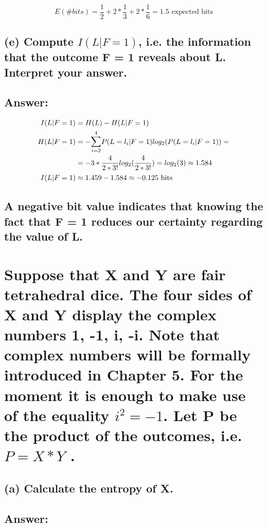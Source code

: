\documentclass[11px]{article}
\begin{document}
\begin{equation}
E(\#bits) = \frac{1}{2} + 2*\frac{1}{3} + 2*\frac{1}{6} = 1.5 \text{ expected bits}
\end{equation}

\subsection*{\normalfont (e) Compute \(I(L|F = 1)\), i.e. the information that the outcome F = 1 reveals about L. Interpret your answer.}

\subsection*{Answer:}

\begin{equation}
\begin{split}
I(L|F = 1) & = H(L) - H(L|F = 1)\\
H(L|F = 1) & = -\mathlarger{\sum}_{i=2}^{4} P(L = l_i|F = 1)log_2(P(L = l_i|F = 1)) = \\
& = -3*\frac{4}{2*3!}log_2(\frac{4}{2*3!}) = log_2(3) \approx 1.584 \\
I(L|F = 1) & \approx 1.459 - 1.584 \approx -0.125 \text{ bits}
\end{split}
\end{equation}

\subsection*{A negative bit value indicates that knowing the fact that F = 1 reduces our certainty regarding the value of L.}



\section{\normalfont Suppose that X and Y are fair tetrahedral dice. The four sides of X and Y display the complex numbers 1, -1, i, -i. Note that complex numbers will be formally introduced in Chapter 5. For the moment it is enough to make use of the equality $i^2 = -1$. Let P
be the product of the outcomes, i.e. $P = X * Y$ .}

\subsection*{\normalfont (a) Calculate the entropy of X.}

\subsection*{Answer:}
\end{document}
